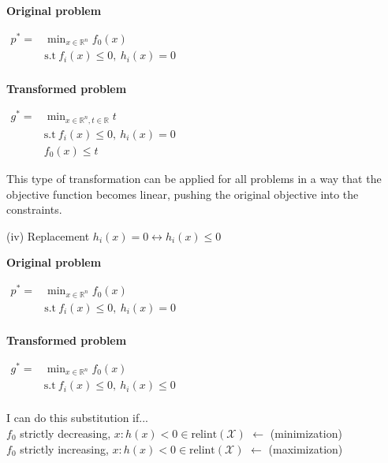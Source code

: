 \documentclass[a4paper]{article}
\begin{document}
\vspace{-0.3cm}
\begin{multicols}{3}
    \noindent
    \textbf{Original problem}
    \begin{center}
        $\begin{aligned}
            p^*=&\min_{x\in\mathbb{R}^n} f_0(x)\\
            &\text{s.t} \ f_i(x)\le 0, \ h_i(x)=0\\
        \end{aligned}$
    \end{center}\newcolumn
    \textbf{Transformed problem}
    \begin{center}
        $\begin{aligned}
            g^*=&\min_{x\in\mathbb{R}^n,t\in\mathbb{R}} {t}\\
            &\text{s.t} \ f_i(x)\le 0, \ h_i(x)=0\\
            &f_0(x)\le{t}
        \end{aligned}$
    \end{center}
    \newcolumn
    This type of transformation can be applied for all problems in a way that the objective function becomes linear, pushing the original objective into the constraints. 
\end{multicols}
\vspace{-0.3cm}
\noindent
\textsf{\large(iv) Replacement $h_i(x)=0 \leftrightarrow h_i(x)\le0$}
\vspace{-0.3cm}
\begin{multicols}{3}
    \noindent
    \textbf{Original problem}
    \begin{center}
        $\begin{aligned}
            p^*=&\min_{x\in\mathbb{R}^n} f_0(x)\\
            &\text{s.t} \ f_i(x)\le 0, \ h_i(x)=0\\
        \end{aligned}$
    \end{center}
    \newcolumn
    \textbf{Transformed problem}
    \begin{center}
        $\begin{aligned}
            g^*=&\min_{x\in\mathbb{R}^n} f_0(x)\\
            &\text{s.t} \ f_i(x)\le 0, \ h_i(x)\le0\\
        \end{aligned}$
    \end{center}
    \newcolumn
    \textsf{I can do this substitution if...}\\
    $f_0$ strictly decreasing, ${x: h(x)<0}\in \text{relint}(\mathcal{X})$ $\leftarrow$ (minimization)\\
    $f_0$ strictly increasing, ${x: h(x)<0}\in \text{relint}(\mathcal{X})$ $\leftarrow$ (maximization)\\
\end{multicols}
\end{document}
